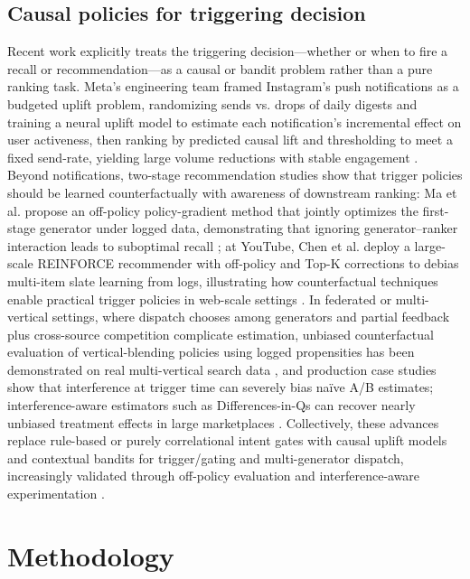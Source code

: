 \documentclass[sigconf, authorversion]{acmart}
\begin{document}
\subsection{Causal policies for triggering decision}
Recent work explicitly treats the triggering decision—whether or when to fire a recall or recommendation—as a causal or bandit problem rather than a pure ranking task. Meta’s engineering team framed Instagram’s push notifications as a budgeted uplift problem, randomizing sends vs. drops of daily digests and training a neural uplift model to estimate each notification’s incremental effect on user activeness, then ranking by predicted causal lift and thresholding to meet a fixed send-rate, yielding large volume reductions with stable engagement \cite{Park2022Instagram}. Beyond notifications, two-stage recommendation studies show that trigger policies should be learned counterfactually with awareness of downstream ranking: Ma et al. propose an off-policy policy-gradient method that jointly optimizes the first-stage generator under logged data, demonstrating that ignoring generator–ranker interaction leads to suboptimal recall \cite{Ma2020OffPolicy}; at YouTube, Chen et al. deploy a large-scale REINFORCE recommender with off-policy and Top-K corrections to debias multi-item slate learning from logs, illustrating how counterfactual techniques enable practical trigger policies in web-scale settings \cite{Chen2019TopK}. In federated or multi-vertical settings, where dispatch chooses among generators and partial feedback plus cross-source competition complicate estimation, unbiased counterfactual evaluation of vertical-blending policies using logged propensities has been demonstrated on real multi-vertical search data \cite{Prochazka2019Vertical}, and production case studies show that interference at trigger time can severely bias naïve A/B estimates; interference-aware estimators such as Differences-in-Qs can recover nearly unbiased treatment effects in large marketplaces \cite{Farias2023Douyin}. Collectively, these advances replace rule-based or purely correlational intent gates with causal uplift models and contextual bandits for trigger/gating and multi-generator dispatch, increasingly validated through off-policy evaluation and interference-aware experimentation \cite{Park2022Instagram,Ma2020OffPolicy,Chen2019TopK,Prochazka2019Vertical,Farias2023Douyin,Ding2023FedCIRec}.

\section{Methodology} 
\end{document}

